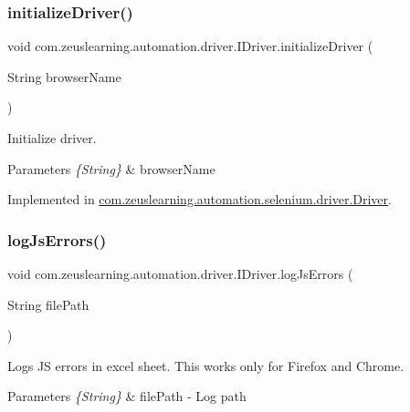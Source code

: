 \subsubsection{\texorpdfstring{initialize\+Driver()}{initializeDriver()}}
{\footnotesize\ttfamily void com.\+zeuslearning.\+automation.\+driver.\+I\+Driver.\+initialize\+Driver (\begin{DoxyParamCaption}\item[{String}]{browser\+Name }\end{DoxyParamCaption})}

Initialize driver.


\begin{DoxyParams}{Parameters}
{\em \{\+String\}} & browser\+Name \\
\hline
\end{DoxyParams}


Implemented in \hyperlink{classcom_1_1zeuslearning_1_1automation_1_1selenium_1_1driver_1_1Driver_a5a80edeb2ead34ac5d92f331a1f59388}{com.\+zeuslearning.\+automation.\+selenium.\+driver.\+Driver}.

\hypertarget{interfacecom_1_1zeuslearning_1_1automation_1_1driver_1_1IDriver_ad474f0bb118dd3e0737e42a8c7a2f51e}{}\label{interfacecom_1_1zeuslearning_1_1automation_1_1driver_1_1IDriver_ad474f0bb118dd3e0737e42a8c7a2f51e} 
\subsubsection{\texorpdfstring{log\+Js\+Errors()}{logJsErrors()}}
{\footnotesize\ttfamily void com.\+zeuslearning.\+automation.\+driver.\+I\+Driver.\+log\+Js\+Errors (\begin{DoxyParamCaption}\item[{String}]{file\+Path }\end{DoxyParamCaption})}

Logs JS errors in excel sheet. This works only for Firefox and Chrome.


\begin{DoxyParams}{Parameters}
{\em \{\+String\}} & file\+Path -\/ Log path \\
\hline
\end{DoxyParams}



